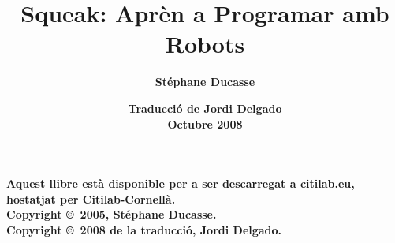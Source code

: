 \documentclass[a4paper,10pt,twoside]{book}
\begin{document}
 
\frontmatter 

\author{\Large{\bf Stéphane Ducasse}} 
\title{{\huge \bf Squeak: Aprèn a Programar amb Robots}} 
\date{{\vspace*{7cm} \bf Traducció de Jordi Delgado\\  Octubre 2008}} 
\maketitle

\vfill
\begin{footnotesize}
\setlength{\parindent}{0pt}

\textbf{\small Aquest llibre està disponible per a ser descarregat a \textsf{citilab.eu}, hostatjat per Citilab-Cornellà.}\\[0.5cm]

\textbf{\small Copyright \copyright~2005, St\'ephane Ducasse.}\\[0.5cm]
\textbf{\small Copyright \copyright~2008 de la traducció, Jordi Delgado.}\\[0.5cm]


\end{footnotesize}
\end{document}
